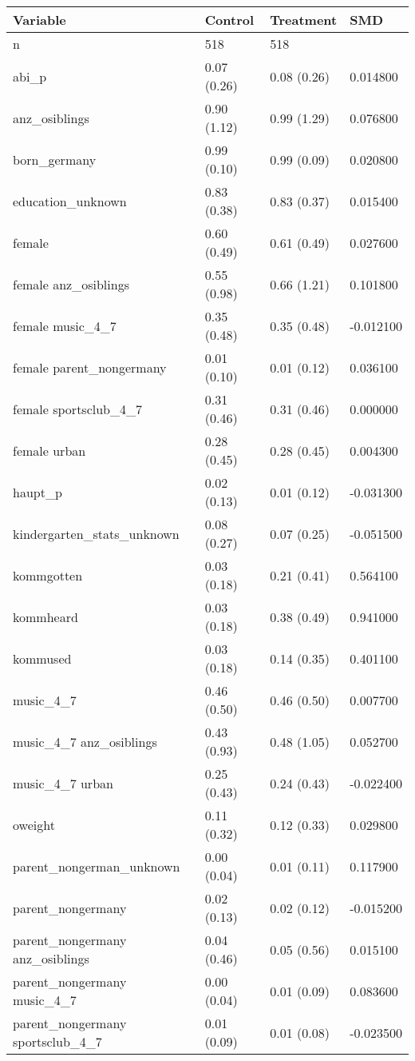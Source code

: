 \begin{tabular}{llll}
\toprule
Variable & Control & Treatment & SMD \\
\midrule
n & 518 & 518 &  \\
abi\_p & 0.07 (0.26) & 0.08 (0.26) & 0.014800 \\
anz\_osiblings & 0.90 (1.12) & 0.99 (1.29) & 0.076800 \\
born\_germany & 0.99 (0.10) & 0.99 (0.09) & 0.020800 \\
education\_unknown & 0.83 (0.38) & 0.83 (0.37) & 0.015400 \\
female & 0.60 (0.49) & 0.61 (0.49) & 0.027600 \\
female anz\_osiblings & 0.55 (0.98) & 0.66 (1.21) & 0.101800 \\
female music\_4\_7 & 0.35 (0.48) & 0.35 (0.48) & -0.012100 \\
female parent\_nongermany & 0.01 (0.10) & 0.01 (0.12) & 0.036100 \\
female sportsclub\_4\_7 & 0.31 (0.46) & 0.31 (0.46) & 0.000000 \\
female urban & 0.28 (0.45) & 0.28 (0.45) & 0.004300 \\
haupt\_p & 0.02 (0.13) & 0.01 (0.12) & -0.031300 \\
kindergarten\_stats\_unknown & 0.08 (0.27) & 0.07 (0.25) & -0.051500 \\
kommgotten & 0.03 (0.18) & 0.21 (0.41) & 0.564100 \\
kommheard & 0.03 (0.18) & 0.38 (0.49) & 0.941000 \\
kommused & 0.03 (0.18) & 0.14 (0.35) & 0.401100 \\
music\_4\_7 & 0.46 (0.50) & 0.46 (0.50) & 0.007700 \\
music\_4\_7 anz\_osiblings & 0.43 (0.93) & 0.48 (1.05) & 0.052700 \\
music\_4\_7 urban & 0.25 (0.43) & 0.24 (0.43) & -0.022400 \\
oweight & 0.11 (0.32) & 0.12 (0.33) & 0.029800 \\
parent\_nongerman\_unknown & 0.00 (0.04) & 0.01 (0.11) & 0.117900 \\
parent\_nongermany & 0.02 (0.13) & 0.02 (0.12) & -0.015200 \\
parent\_nongermany anz\_osiblings & 0.04 (0.46) & 0.05 (0.56) & 0.015100 \\
parent\_nongermany music\_4\_7 & 0.00 (0.04) & 0.01 (0.09) & 0.083600 \\
parent\_nongermany sportsclub\_4\_7 & 0.01 (0.09) & 0.01 (0.08) & -0.023500 \\

\end{tabular}
